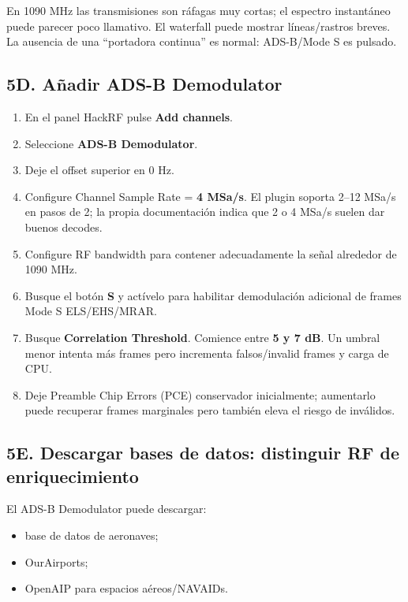 \begin{esperado}
En 1090 MHz las transmisiones son ráfagas muy cortas; el espectro instantáneo puede parecer poco llamativo. El waterfall puede mostrar líneas/rastros breves. La ausencia de una ``portadora continua'' es normal: ADS-B/Mode S es pulsado.
\end{esperado}

\subsection{5D. Añadir ADS-B Demodulator}

\begin{enumerate}
    \item En el panel HackRF pulse \textbf{Add channels}.
    \item Seleccione \textbf{ADS-B Demodulator}.
    \item Deje el offset superior en 0 Hz.
    \item Configure Channel Sample Rate = \textbf{4 MSa/s}. El plugin soporta 2--12 MSa/s en pasos de 2; la propia documentación indica que 2 o 4 MSa/s suelen dar buenos decodes.
    \item Configure RF bandwidth para contener adecuadamente la señal alrededor de 1090 MHz.
    \item Busque el botón \textbf{S} y actívelo para habilitar demodulación adicional de frames Mode S ELS/\allowbreak EHS/\allowbreak MRAR.
    \item Busque \textbf{Correlation Threshold}. Comience entre \textbf{5 y 7 dB}. Un umbral menor intenta más frames pero incrementa falsos/invalid frames y carga de CPU.
    \item Deje Preamble Chip Errors (PCE) conservador inicialmente; aumentarlo puede recuperar frames marginales pero también eleva el riesgo de inválidos.
\end{enumerate}

\subsection{5E. Descargar bases de datos: distinguir RF de enriquecimiento}

El ADS-B Demodulator puede descargar:

\begin{itemize}
    \item base de datos de aeronaves;
    \item OurAirports;
    \item OpenAIP para espacios aéreos/NAVAIDs.
\end{itemize}

